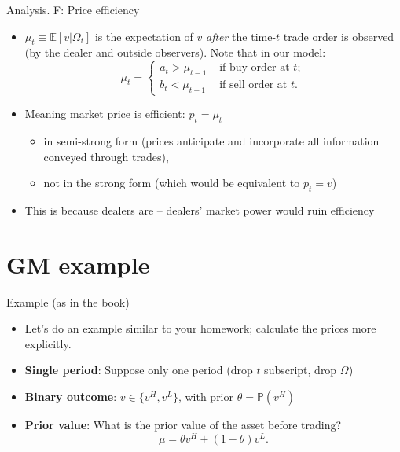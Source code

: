 \documentclass[english,10pt
,aspectratio=169
]{beamer}
\begin{document}
\begin{frame}{Analysis. F: Price efficiency}
	\begin{itemize}
		\item $\mu_t \equiv \mathbb{E}[v | \Omega_t]$ is the expectation of $v$ \emph{after} the time-$t$ trade order is observed (by the dealer and outside observers). Note that in our model:
		$$\mu_t = \begin{cases}
			a_t > \mu_{t-1} & \text{ if buy order at } t;
			\\
			b_t < \mu_{t-1} & \text{ if sell order at } t.
		\end{cases} $$
		\item Meaning market price is efficient: $p_t = \mu_t$
		\begin{itemize}
			\item in \alert{semi-strong} form (prices anticipate and incorporate all information conveyed through trades),
			\item not in the \alert{strong} form (which would be equivalent to $p_t = v$)
		\end{itemize}
		\pause 
		\item This is because dealers are  -- dealers' market power would ruin efficiency
	\end{itemize}
\end{frame}




\section{GM example}

\begin{frame}{Example (as in the book)}
\begin{itemize}
	\item Let's do an example similar to your homework; calculate the prices more explicitly.
	\bigskip 
	\item \textbf{Single period}: Suppose only one period (drop $t$ subscript, drop $\Omega$)
	\item \textbf{Binary outcome}: $v \in \{ v^H, v^L\}$, with prior $\theta=\mathbb{P}(v^H) $ 
	\item \textbf{Prior value}: What is the prior value of the asset before trading?
	\[
	\mu=\theta v^H+(1-\theta) v^L.
	\]
	\hyperlink{overview}{}
\end{itemize}
\end{frame}
\end{document}
